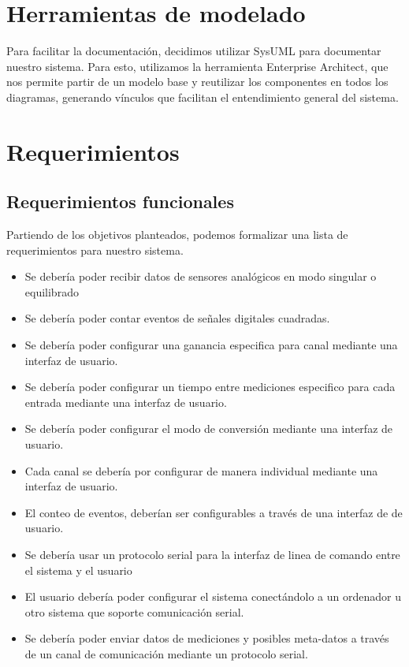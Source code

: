 \section{Herramientas de modelado} %
\label{sec:herramientas_de_modelado}

Para facilitar la documentación, decidimos utilizar SysUML para documentar nuestro sistema. Para esto, utilizamos la herramienta Enterprise Architect, que nos permite partir de un modelo base y reutilizar los componentes en todos los diagramas, generando vínculos que facilitan el entendimiento general del sistema. 


\section{Requerimientos} %
\label{sec:requerimientos}

\subsection{Requerimientos funcionales} %
\label{sub:requerimientos_funcionales}

Partiendo de los objetivos planteados, podemos formalizar una lista de requerimientos para nuestro sistema.

\begin{itemize}
	\item Se debería poder recibir datos de sensores analógicos en modo singular o equilibrado
	\item Se debería poder contar eventos de señales digitales cuadradas.
	\item Se debería poder configurar una ganancia especifica para canal mediante una interfaz de usuario.
	\item Se debería poder configurar un tiempo entre mediciones especifico para cada entrada mediante una interfaz de usuario.
	\item Se debería poder configurar el modo de conversión mediante una interfaz de usuario.
	\item Cada canal se debería por configurar de manera individual mediante una interfaz de usuario.
	\item El conteo de eventos, deberían ser configurables a través de una interfaz de de usuario.
	\item Se debería usar un protocolo serial para la interfaz de linea de comando entre el sistema y el usuario
	\item El usuario debería poder configurar el sistema conectándolo a un ordenador u otro sistema que soporte comunicación serial.
	\item Se debería poder enviar datos de mediciones y posibles meta-datos a través de un canal de comunicación mediante un protocolo serial.
\end{itemize}

